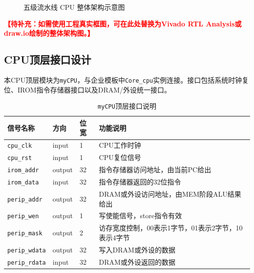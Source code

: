 \documentclass[UTF8,a4paper,12pt]{ctexart}
\newcommand{\todo}[1]{\textcolor{red}{\textbf{【待补充：#1】}}}
\newcommand{\code}[1]{\texttt{#1}}
\begin{document}
\begin{figure}[H]
{
}
\caption{五级流水线 CPU 整体架构示意图}
\label{fig:cpu_arch}
\end{figure}

\todo{如需使用工程真实框图，可在此处替换为Vivado RTL Analysis或draw.io绘制的整体架构图。}

\subsection{CPU顶层接口设计}

本CPU顶层模块为\code{myCPU}，与企业模板中\code{Core\_cpu}实例连接。接口包括系统时钟复位、IROM指令存储器接口以及DRAM/外设统一接口。

\begin{table}[H]
\centering
\caption{\code{myCPU}顶层接口说明}
\begin{tabularx}{\textwidth}{p{3cm}p{2cm}p{2cm}X}
\toprule
信号名称 & 方向 & 位宽 & 功能说明 \\
\midrule
\code{cpu\_clk} & input & 1 & CPU工作时钟 \\
\code{cpu\_rst} & input & 1 & CPU复位信号 \\
\code{irom\_addr} & output & 32 & 指令存储器访问地址，由当前PC给出 \\
\code{irom\_data} & input & 32 & 指令存储器返回的32位指令 \\
\code{perip\_addr} & output & 32 & DRAM或外设访问地址，由MEM阶段ALU结果给出 \\
\code{perip\_wen} & output & 1 & 写使能信号，store指令有效 \\
\code{perip\_mask} & output & 2 & 访存宽度控制，00表示1字节，01表示2字节，10表示4字节 \\
\code{perip\_wdata} & output & 32 & 写入DRAM或外设的数据 \\
\code{perip\_rdata} & input & 32 & DRAM或外设返回的数据 \\
\bottomrule
\end{tabularx}
\end{table}
\end{document}
